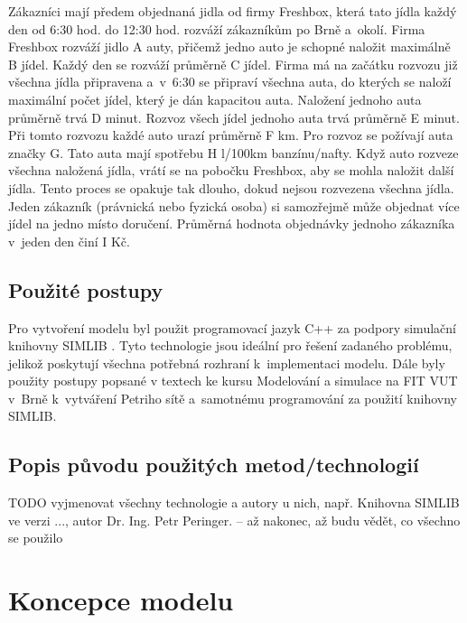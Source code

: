 \documentclass[a4paper, 11pt]{article}
\begin{document}
	Zákazníci mají předem objednaná jidla od firmy Freshbox, která tato jídla
	každý den od 6:30 hod. do 12:30 hod. rozváží zákazníkům po Brně a~okolí.
	Firma Freshbox rozváží jidlo A auty, přičemž jedno auto
	je schopné naložit  maximálně B jídel. Každý den se rozváží
	průměrně C jídel. Firma má na začátku rozvozu již všechna jídla
	připravena a~v~6:30 se připraví všechna auta, do kterých se naloží
	maximální počet jídel, který je dán kapacitou auta. Naložení jednoho
	auta průměrně trvá D minut. Rozvoz všech jídel jednoho auta
	trvá průměrně E minut. Při tomto rozvozu každé auto urazí
	průměrně F km. Pro rozvoz se požívají auta značky G.
	Tato auta mají spotřebu H l/100km banzínu/nafty. Když auto rozveze
	všechna naložená jídla, vrátí se na pobočku Freshbox, aby se mohla
	naložit další jídla. Tento proces se opakuje tak dlouho, dokud nejsou
	rozvezena všechna jídla. Jeden zákazník (právnická nebo fyzická osoba)
	si samozřejmě může objednat více jídel na jedno místo doručení.
	Průměrná hodnota objednávky jednoho zákazníka v~jeden den činí I Kč.


	\subsection{Použité postupy}

	Pro vytvoření modelu byl použit programovací jazyk C++ za podpory
	simulační knihovny SIMLIB \cite{SIMLIB}. Tyto technologie jsou ideální pro
	řešení zadaného problému, jelikož poskytují všechna potřebná rozhraní
	k~implementaci modelu. Dále byly použity postupy popsané v textech
	ke kursu Modelování a simulace na FIT VUT v~Brně \cite{IMS_slides}
	k~vytváření Petriho sítě \cite[snímek 123]{IMS_slides} a~samotnému
	programování za použití knihovny SIMLIB.


	\subsection{Popis původu použitých metod/technologií}

	TODO vyjmenovat všechny technologie a autory u nich, např.
	Knihovna SIMLIB ve verzi ..., autor Dr. Ing. Petr Peringer.
	-- až nakonec, až budu vědět, co všechno se použilo



	\section{Koncepce modelu}
\end{document}
